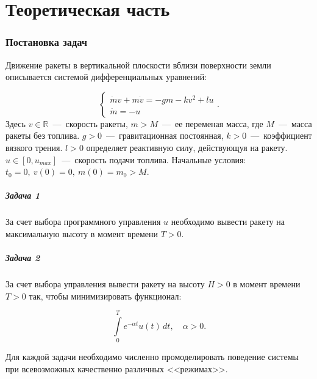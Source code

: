 \documentclass[12pt, a4paper]{article} %
\newcommand{\Real}{\mathbb{R}}
\begin{document}


\tableofcontents

\newpage

\part{Теоретическая часть}

\section{Постановка задач}

Движение ракеты в вертикальной плоскости вблизи поверхности земли
описывается системой дифференциальных уравнений:

\begin{equation}\label{eq:init_prb}
    \begin{cases}
        \dot m v + m \dot v = -gm -kv^2 + lu \\
        \dot m = -u
    \end{cases}
.\end{equation} 
Здесь $v \in \Real$~---~скорость ракеты, $m > M$~---~ее переменая масса,
где  $M$~---~масса ракеты без топлива. 
$g > 0$~---~гравитационная постоянная, $k > 0$~---~коэффициент вязкого трения.
$l > 0$ определяет реактивную силу, действующуя на ракету.
$u \in [0, u_{max}]$~---~скорость подачи топлива.
Начальные условия:  $t_0 = 0,\ v(0) = 0,\ m(0) = m_0 > M$.

\subsubsection*{Задача 1}

За счет выбора программного управления $u$ необходимо вывести ракету 
на максимальную высоту в момент времени  $T > 0$.

\subsubsection*{Задача 2}

За счет выбора управления вывести ракету на высоту  $H > 0$ в момент времени 
$T > 0$ так, чтобы минимизировать функционал:

\begin{equation}\label{eq:functional}
    \int\limits_{0}^{T} e^{-\alpha t} u(t)\,dt, \quad \alpha > 0
.\end{equation} 

Для каждой задачи необходимо численно промоделировать поведение системы
при всевозможных качественно различных <<режимах>>.
\end{document}

